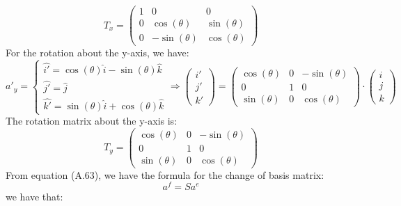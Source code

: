 \documentclass{article}
\begin{document}
\begin{equation}
    T_x =
    \begin{pmatrix}
        1 & 0 & 0 \\
        0 & \cos(\theta) & \sin(\theta) \\
        0 & -\sin(\theta) & \cos(\theta)
    \end{pmatrix}
\end{equation}
For the rotation about the y-axis, we have:
\begin{equation*}
    a'_y =
    \begin{cases}
        \hat{i'} = \cos(\theta) \hat{i} - \sin(\theta) \hat{k} \\
        \hat{j'} = \hat{j} \\
        \hat{k'} = \sin(\theta) \hat{i} + \cos(\theta) \hat{k}
    \end{cases}
    \Rightarrow
    \begin{pmatrix}
        i' \\
        j' \\
        k'
    \end{pmatrix}
    =
    \begin{pmatrix}
        \cos(\theta) & 0 & -\sin(\theta) \\
        0 & 1 & 0 \\
        \sin(\theta) & 0 & \cos(\theta)
    \end{pmatrix}
    \cdot
    \begin{pmatrix}
        i \\
        j \\
        k
    \end{pmatrix}
\end{equation*}
The rotation matrix about the y-axis is:
\begin{equation*}
    T_y = 
    \begin{pmatrix}
        \cos(\theta) & 0 & -\sin(\theta) \\
        0 & 1 & 0 \\
        \sin(\theta) & 0 & \cos(\theta)
    \end{pmatrix}
\end{equation*}
From equation (A.63), we have the formula for the change of basis matrix:
\[a^f = Sa^e\]
we have that: 
\end{document}
